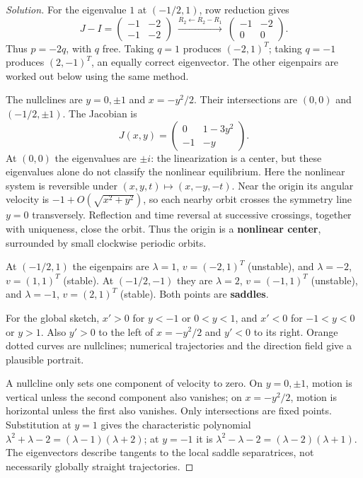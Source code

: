 \documentclass[10pt]{amsart}
\newenvironment{solution}
{\begin{proof}[Solution]}
{\end{proof}}
\begin{document}
\begin{enumerate}[label=\arabic*), leftmargin=*, itemsep=1em]
\begin{solution}
For the eigenvalue $1$ at $(-1/2,1)$, row reduction gives
\[
J-I=\begin{pmatrix}-1&-2\\-1&-2\end{pmatrix}
\ \xrightarrow{R_2\leftarrow R_2-R_1}\ 
\begin{pmatrix}-1&-2\\0&0\end{pmatrix}.
\]
Thus $p=-2q$, with $q$ free. Taking $q=1$ produces $(-2,1)^T$; taking $q=-1$ produces $(2,-1)^T$, an equally correct eigenvector. The other eigenpairs are worked out below using the same method.


The nullclines are $y=0,\pm1$ and $x=-y^2/2$. Their intersections are $(0,0)$ and $(-1/2,\pm1)$. The Jacobian is
\[
J(x,y)=\begin{pmatrix}0&1-3y^2\\-1&-y\end{pmatrix}.
\]
At $(0,0)$ the eigenvalues are $\pm i$: the linearization is a center, but these eigenvalues alone do not classify the nonlinear equilibrium. Here the nonlinear system is reversible under $(x,y,t)\mapsto(x,-y,-t)$. Near the origin its angular velocity is $-1+O(\sqrt{x^2+y^2})$, so each nearby orbit crosses the symmetry line $y=0$ transversely. Reflection and time reversal at successive crossings, together with uniqueness, close the orbit. Thus the origin is a \textbf{nonlinear center}, surrounded by small clockwise periodic orbits.

At $(-1/2,1)$ the eigenpairs are $\lambda=1$, $v=(-2,1)^T$ (unstable), and $\lambda=-2$, $v=(1,1)^T$ (stable). At $(-1/2,-1)$ they are $\lambda=2$, $v=(-1,1)^T$ (unstable), and $\lambda=-1$, $v=(2,1)^T$ (stable). Both points are \textbf{saddles}.

For the global sketch, $x'>0$ for $y<-1$ or $0<y<1$, and $x'<0$ for $-1<y<0$ or $y>1$. Also $y'>0$ to the left of $x=-y^2/2$ and $y'<0$ to its right. Orange dotted curves are nullclines; numerical trajectories and the direction field give a plausible portrait.

A nullcline only sets one component of velocity to zero. On $y=0,\pm1$, motion is vertical unless the second component also vanishes; on $x=-y^2/2$, motion is horizontal unless the first also vanishes. Only intersections are fixed points. Substitution at $y=1$ gives the characteristic polynomial $\lambda^2+\lambda-2=(\lambda-1)(\lambda+2)$; at $y=-1$ it is $\lambda^2-\lambda-2=(\lambda-2)(\lambda+1)$. The eigenvectors describe tangents to the local saddle separatrices, not necessarily globally straight trajectories.


\end{solution}
\end{enumerate}
\end{document}
